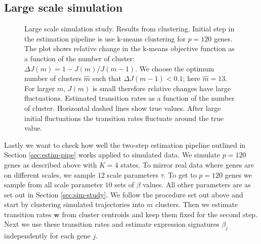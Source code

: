 \subsection{Large scale simulation}
\label{sec:large-scale-model}

\begin{figure}
  \centering
  \caption{Large scale simulation study. Results from clustering.  Initial step in the estimation pipeline is use k-means clustering for $p=120$ genes. The plot shows relative change in the k-means objective function as a function of the number of cluster: $\Delta J(m) = 1 - J(m) / J(m - 1)$. We choose the optimum number of clusters $\hat{m}$ such that $\Delta J(m - 1) < 0.1$; here $\hat{m} = 13$. For larger $m$, $J(m)$ is small therefore relative changes have large fluctuations.  Estimated transition rates as a function of the number of cluster. Horizontal dashed lines show true values. After large initial fluctuations the transition rates fluctuate around the true value.}
  \label{fig:lrg-sim-clust}
\end{figure}


Lastly we want to check how well the two-step estimation pipeline outlined in Section \ref{sec:estim-pipe} works applied to simulated data. We simulate $p=120$ genes as described above with $K=4$ states. To mirror real data where genes are on different scales, we sample $12$ scale parameters $\tau$. To get to $p=120$ genes we sample from all scale parameter $10$ sets of $\beta$ values. All other parameters are as set out in Section \ref{sec:sim-study}. We follow the procedure set out above and start by clustering simulated trajectories into $m$ clusters. Then we estimate transition rates $\mathbf{w}$ from cluster centroids and keep them fixed for the second step. Next we use these transition rates and estimate expression signatures $\beta_j$ independently for each gene $j$.




